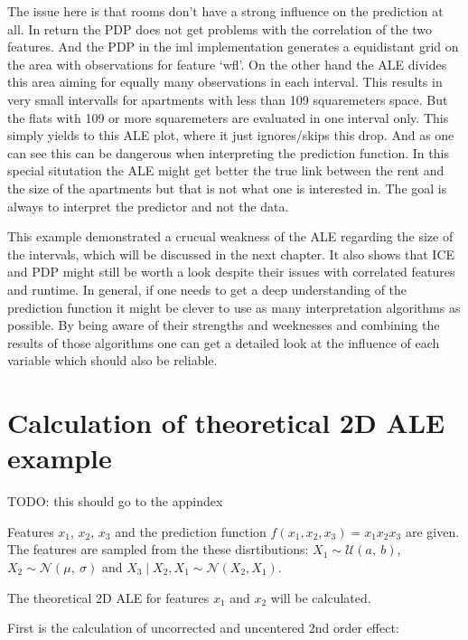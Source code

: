 \documentclass[
]{krantz}
\begin{document}
The issue here is that rooms don't have a strong influence on the prediction at all. In return the PDP does not get problems with the correlation of the two features. And the PDP in the iml implementation generates a equidistant grid on the area with observations for feature `wfl'. On the other hand the ALE divides this area aiming for equally many observations in each interval. This results in very small intervalls for apartments with less than 109 squaremeters space. But the flats with 109 or more squaremeters are evaluated in one interval only. This simply yields to this ALE plot, where it just ignores/skips this drop. And as one can see this can be dangerous when interpreting the prediction function. In this special situtation the ALE might get better the true link between the rent and the size of the apartments but that is not what one is interested in. The goal is always to interpret the predictor and not the data.

This example demonstrated a crucual weakness of the ALE regarding the size of the intervals, which will be discussed in the next chapter. It also shows that ICE and PDP might still be worth a look despite their issues with correlated features and runtime. In general, if one needs to get a deep understanding of the prediction function it might be clever to use as many interpretation algorithms as possible. By being aware of their strengths and weeknesses and combining the results of those algorithms one can get a detailed look at the influence of each variable which should also be reliable.

\hypertarget{ale-2d-example-calculation}{%
\section{Calculation of theoretical 2D ALE example}\label{ale-2d-example-calculation}}

TODO: this should go to the appindex

Features \(x_1\), \(x_2\), \(x_3\) and the prediction function \(\hat{f}(x_1, x_2, x_3) = x_1 x_2 x_3\) are given.
The features are sampled from the these disrtibutions:
\(X_1 \sim \mathcal{U}(a,~b)\), \(X_2 \sim \mathcal{N}(\mu,~\sigma)\) and \(X_3\mid X_2, X_1 \sim \mathcal{N}(X_2,X_1)\).

The theoretical 2D ALE for features \(x_1\) and \(x_2\) will be calculated.

First is the calculation of uncorrected and uncentered 2nd order effect:
\end{document}
